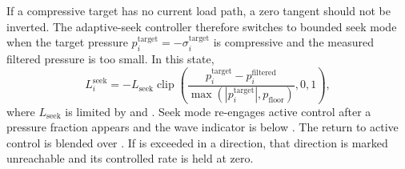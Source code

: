 If a compressive target has no current load path, a zero tangent should not be
inverted.  The adaptive-seek controller therefore switches to bounded seek mode
when the target pressure $p_i^{\mathrm{target}}=-\sigma_i^{\mathrm{target}}$ is
compressive and the measured filtered pressure is too small.  In this state,
\begin{equation}
  L_i^{\mathrm{seek}} =
  -L_{\mathrm{seek}}
  \operatorname{clip}\left(
    \frac{p_i^{\mathrm{target}}-p_i^{\mathrm{filtered}}}
         {\max(|p_i^{\mathrm{target}}|,p_{\mathrm{floor}})},0,1
  \right),
  \label{eq:bc-adaptive-seek-seek-law}
\end{equation}
where $L_{\mathrm{seek}}$ is limited by  and
.  Seek mode re-engages active control
after a pressure fraction  appears and
the wave indicator is below .  The return
to active control is blended over .  If
 is exceeded in a direction, that direction is
marked unreachable and its controlled rate is held at zero.

